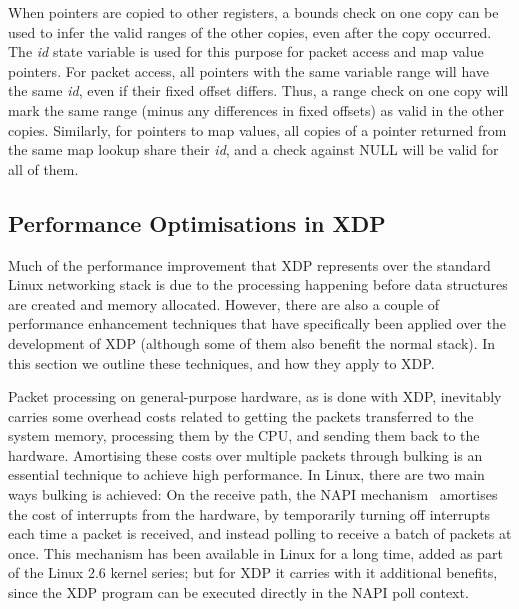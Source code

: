 \documentclass[10pt,sigconf]{acmart}
\begin{document}
When pointers are copied to other registers, a bounds check on one copy can be
used to infer the valid ranges of the other copies, even after the copy
occurred. The \emph{id} state variable is used for this purpose for packet access and
map value pointers. For packet access, all pointers with the same variable
range will have the same \emph{id}, even if their fixed offset differs. Thus, a range
check on one copy will mark the same range (minus any differences in fixed
offsets) as valid in the other copies. Similarly, for pointers to map values,
all copies of a pointer returned from the same map lookup share their \emph{id}, and
a check against NULL will be valid for all of them.



\subsection{Performance Optimisations in XDP}
\label{sec:perf-optim-xdp}

Much of the performance improvement that XDP represents over the standard Linux
networking stack is due to the processing happening before data structures are
created and memory allocated. However, there are also a couple of performance
enhancement techniques that have specifically been applied over the development
of XDP (although some of them also benefit the normal stack). In this section we
outline these techniques, and how they apply to XDP.

Packet processing on general-purpose hardware, as is done with XDP, inevitably
carries some overhead costs related to getting the packets transferred to the
system memory, processing them by the CPU, and sending them back to the
hardware. Amortising these costs over multiple packets through bulking is an
essential technique to achieve high performance. In Linux, there are two main
ways bulking is achieved: On the receive path, the NAPI mechanism~\cite{napi}
amortises the cost of interrupts from the hardware, by temporarily turning off
interrupts each time a packet is received, and instead polling to receive a
batch of packets at once. This mechanism has been available in Linux for a
long time, added as part of the Linux 2.6 kernel series; but for XDP it carries
with it additional benefits, since the XDP program can be executed directly in
the NAPI poll context.
\end{document}
